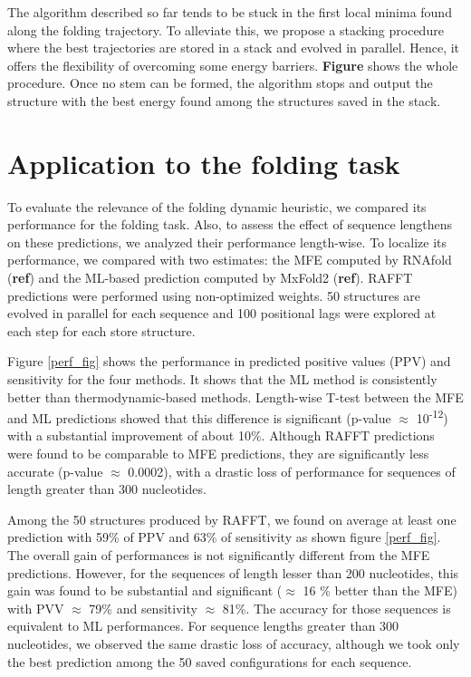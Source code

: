 \documentclass[a4paper,12pt]{article}
\begin{document}
{{The algorithm described so far tends to be stuck in the first local minima found
along the folding trajectory. To alleviate this, we propose a stacking procedure
where the best trajectories are stored in a stack and evolved in parallel.
Hence, it offers the flexibility of overcoming some energy barriers. \textbf{Figure}
shows the whole procedure. Once no stem can be formed, the algorithm stops and
output the structure with the best energy found among the structures saved in
the stack.

\section{Application to the folding task}
\label{sec:org9f09ffe}
To evaluate the relevance of the folding dynamic heuristic, we compared its
performance for the folding task. Also, to assess the effect of sequence
lengthens on these predictions, we analyzed their performance length-wise. To
localize its performance, we compared with two estimates: the MFE computed by
RNAfold (\textbf{ref}) and the ML-based prediction computed by MxFold2 (\textbf{ref}). RAFFT
predictions were performed using non-optimized weights. 50 structures are
evolved in parallel for each sequence and 100 positional lags were explored at
each step for each store structure.

Figure \ref{perf_fig} shows the performance in predicted positive values (PPV) and
sensitivity for the four methods. It shows that the ML method is consistently
better than thermodynamic-based methods. Length-wise T-test between the MFE and
ML predictions showed that this difference is significant (p-value \(\approx\)
10\textsuperscript{-12}) with a substantial improvement of about 10\%. Although RAFFT
predictions were found to be comparable to MFE predictions, they are
significantly less accurate (p-value \(\approx\) 0.0002), with a drastic loss of
performance for sequences of length greater than 300 nucleotides.

Among the 50 structures produced by RAFFT, we found on average at least one
prediction with 59\% of PPV and 63\% of sensitivity as shown figure \ref{perf_fig}.
The overall gain of performances is not significantly different from the MFE
predictions. However, for the sequences of length lesser than 200 nucleotides,
this gain was found to be substantial and significant (\(\approx\) 16 \% better than
the MFE) with PVV \(\approx\) 79\% and sensitivity \(\approx\) 81\%. The accuracy for
those sequences is equivalent to ML performances. For sequence lengths greater
than 300 nucleotides, we observed the same drastic loss of accuracy, although we
took only the best prediction among the 50 saved configurations for each
sequence.

}}
\end{document}
